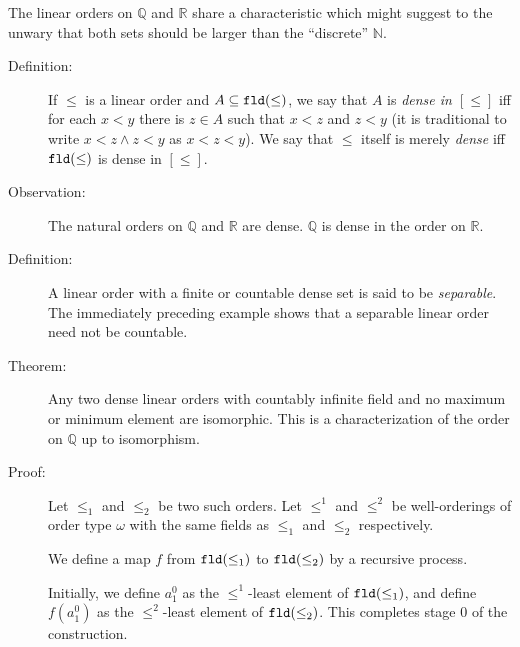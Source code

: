 \documentclass[12pt]{book}
\begin{document}
The linear orders on $\mathbb Q$ and $\mathbb R$ share a
characteristic which might suggest to the unwary that both sets should
be larger than the ``discrete'' ${\mathbb N}$.

\begin{description}

\item[Definition:] If $\leq$ is a linear order and $A \subseteq {\tt
fld}(\leq)$, we say that $A$ is {\em dense in $[\leq]$\/} iff for each $x<y$
there is $z\in A$ such that $x<z$ and $z<y$ (it is traditional to write
$x<z \wedge z<y$ as $x<z<y$).  We say that $\leq$ itself is merely
{\em dense} iff ${\tt fld}(\leq)$ is dense in $[\leq]$.

\item[Observation:] The natural orders on $\mathbb Q$ and $\mathbb R$
are dense.  ${\mathbb Q}$ is dense in the order on ${\mathbb R}$.

\item[Definition:] A linear order with a finite or countable dense set
is said to be {\em separable\/}.  The immediately preceding example
shows that a separable linear order need not be countable.

\item[Theorem:] Any two dense linear orders with countably infinite
field and no maximum or minimum element are isomorphic.  This is a
characterization of the order on ${\mathbb Q}$ up to isomorphism.

\item[Proof:]  Let $\leq_1$ and $\leq_2$ be two such orders.
Let $\leq^1$ and $\leq^2$ be well-orderings of order type $\omega$
with the same fields as $\leq_1$ and $\leq_2$ respectively.

We define a map $f$ from ${\tt fld}(\leq_1)$ to ${\tt fld}(\leq_2)$ by
a recursive process.  

Initially, we define $a^0_1$ as the $\leq^1$-least element of ${\tt
fld}(\leq_1)$, and define $f(a^0_1)$ as the $\leq^2$-least element of
${\tt fld}(\leq_2)$.  This completes stage 0 of the construction.


\end{description}
\end{document}
